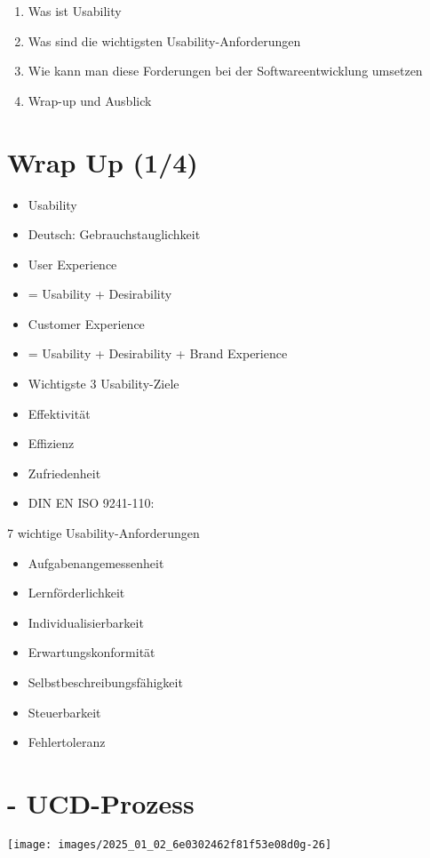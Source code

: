 \documentclass[10pt]{article}
\begin{document}
\begin{enumerate}
  \item Was ist Usability
  \item Was sind die wichtigsten Usability-Anforderungen
  \item Wie kann man diese Forderungen bei der Softwareentwicklung umsetzen
  \item Wrap-up und Ausblick
\end{enumerate}

\section*{Wrap Up (1/4)}
\begin{itemize}
  \item Usability
  \item Deutsch: Gebrauchstauglichkeit
  \item User Experience
  \item = Usability + Desirability
  \item Customer Experience
  \item = Usability + Desirability + Brand Experience
  \item Wichtigste 3 Usability-Ziele
  \item Effektivität
  \item Effizienz
  \item Zufriedenheit
  \item DIN EN ISO 9241-110:
\end{itemize}

7 wichtige Usability-Anforderungen

\begin{itemize}
  \item Aufgabenangemessenheit
  \item Lernförderlichkeit
  \item Individualisierbarkeit
  \item Erwartungskonformität
  \item Selbstbeschreibungsfähigkeit
  \item Steuerbarkeit
  \item Fehlertoleranz
\end{itemize}

\section*{- UCD-Prozess}
\begin{center}
\texttt{[image: images/2025\_01\_02\_6e0302462f81f53e08d0g-26]}
\end{center}
\end{document}
